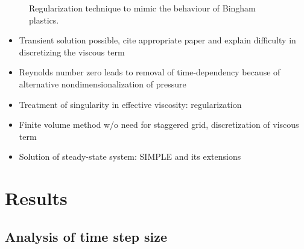 \documentclass[final,3p,twocolumn]{elsarticle}
\begin{document}
\begin{figure}[htb]
    \centering
    \caption{Regularization technique to mimic the behaviour of Bingham
    plastics.}
    \label{fig:regularization}
\end{figure}

\begin{itemize}
    \item Transient solution possible, cite appropriate paper and explain
        difficulty in discretizing the viscous term
    \item Reynolds number zero leads to removal of time-dependency because of
        alternative nondimensionalization of pressure 
    \item Treatment of singularity in effective viscosity: regularization
    \item Finite volume method w/o need for staggered grid, discretization of
        viscous term
    \item Solution of steady-state system: SIMPLE and its extensions
\end{itemize}

\section{Results}
\label{sec:results}

\subsection{Analysis of time step size}
\label{subsec:timeStep}
\end{document}
